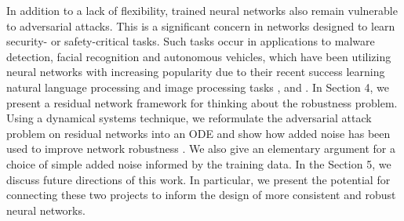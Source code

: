 \documentclass[12pt]{article}
\begin{document}
\indent In addition to a lack of flexibility, trained neural networks also remain vulnerable to adversarial attacks. This is a significant concern in networks designed to learn security- or safety-critical tasks. Such tasks occur in applications to malware detection, facial recognition and autonomous vehicles, which have been utilizing neural networks with increasing popularity due to their recent success learning natural language processing and image processing tasks \cite{imageconv}, \cite{rectifiers} and \cite{langproc}. In Section 4, we present a residual network framework for thinking about the robustness problem. Using a dynamical systems technique, we reformulate the adversarial attack problem on residual networks into an ODE and show how added noise has been used to improve network robustness \cite{res}. We also give an elementary argument for a choice of simple added noise informed by the training data. In the Section 5, we discuss future directions of this work. In particular, we present the potential for connecting these two projects to inform the design of more consistent and robust neural networks.
\end{document}
